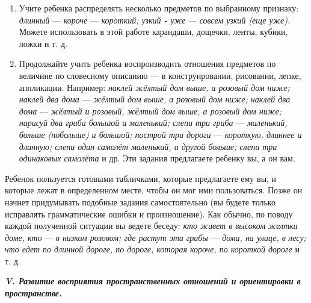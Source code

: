 \documentclass{book}
\renewcommand{\emph}[1]{\textit{#1}}
\begin{document}
\begin{enumerate}
\def\labelenumi{\arabic{enumi}.}
\setcounter{enumi}{3}
\item
  
  Учите ребенка распределять несколько предметов по выбранному признаку:
  \emph{длинный} --- \emph{короче} --- \emph{короткий; узкий \textbf{-}
  уже} --- \emph{совсем узкий (еще уже).} Можете использовать в этой
  работе карандаши, дощечки, ленты, кубики, ложки и т. д.
  
\item
  
  Продолжайте учить ребенка воспроизводить отношения предметов по
  величине по словесному описанию --- в конструировании, рисовании,
  лепке, аппликации. Например: \emph{наклей жёлтый дом выше, а розовый
  дом ниже; наклей два дома} --- \emph{жёлтый дом выше, а розовый дом
  ниже; наклей два дома} --- \emph{жёлтый и розовый, жёлтый дом выше, а
  розовый дом ниже; нарисуй два гриба большой и маленький; слепи три
  гриба} --- \emph{маленький, больше (побольше) и большой; построй три
  дороги} --- \emph{короткую, длиннее и длинную; слепи один самолёт
  маленький, а другой больше; слепи три одинаковых самолёта} и др. Эти
  задания предлагаете ребенку вы, а он вам.
  
\end{enumerate}


Ребенок пользуется готовыми табличками, которые предлагаете ему вы, и
которые лежат в определенном месте, чтобы он мог ими пользоваться. Позже
он начнет придумывать подобные задания самостоятельно (вы будете только
исправлять грамматические ошибки и произношение). Как обычно, по поводу
каждой полученной ситуации вы ведете беседу: \emph{кто живет в высоком
желтки доме, кто} --- \emph{в низком розовом; где растут эти грибы} ---
\emph{дома, на улице, в лесу; что едет по длинной дороге, по дороге,
которая короче, по короткой дороге} и т. д.

\emph{\textbf{V. Развитие восприятия пространственных отношений и
ориентировки в пространстве.}}
\end{document}

